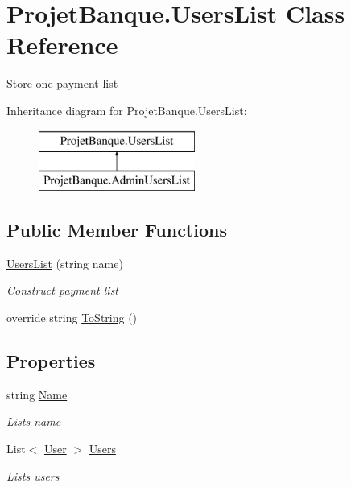 \hypertarget{class_projet_banque_1_1_users_list}{}\section{Projet\+Banque.\+Users\+List Class Reference}
\label{class_projet_banque_1_1_users_list}


Store one payment list  


Inheritance diagram for Projet\+Banque.\+Users\+List\+:\begin{figure}[H]
\begin{center}
\leavevmode
\includegraphics[height=2.000000cm]{class_projet_banque_1_1_users_list}
\end{center}
\end{figure}
\subsection*{Public Member Functions}
\begin{DoxyCompactItemize}
\item 
\mbox{\hyperlink{class_projet_banque_1_1_users_list_ac4e2ed2432841628f77f4a9a437714ef}{Users\+List}} (string name)
\begin{DoxyCompactList}\small\item\em Construct payment list \end{DoxyCompactList}\item 
override string \mbox{\hyperlink{class_projet_banque_1_1_users_list_ab718952e4885cf0331159b2469d38d7f}{To\+String}} ()
\end{DoxyCompactItemize}
\subsection*{Properties}
\begin{DoxyCompactItemize}
\item 
string \mbox{\hyperlink{class_projet_banque_1_1_users_list_a563f87594db97ece776aa3c229af316a}{Name}}
\begin{DoxyCompactList}\small\item\em List\textquotesingle{}s name \end{DoxyCompactList}\item 
List$<$ \mbox{\hyperlink{class_projet_banque_1_1_user}{User}} $>$ \mbox{\hyperlink{class_projet_banque_1_1_users_list_aa31d44788c6aefd240ab776aeab7f18b}{Users}}
\begin{DoxyCompactList}\small\item\em List\textquotesingle{}s users \end{DoxyCompactList}\end{DoxyCompactItemize}


